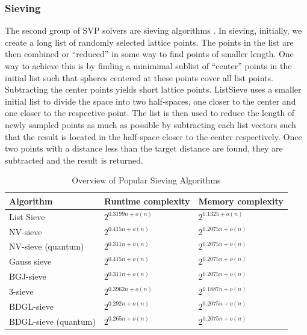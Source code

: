 \subsubsection{Sieving}
The second group of SVP solvers are sieving algorithms \cite{ADHKPS19, MV10, NV08, BGJ15, BLS16, HK17,BDGL16}. In sieving, initially, we create a long list of randomly selected lattice points. The points in the list are then combined or ``reduced'' in some way to find points of smaller length. One way to achieve this is by finding a minimimal sublist of ``center'' points in the initial list such that spheres centered at these points cover all list points. Subtracting the center points yields short lattice points. ListSieve \cite{MV10} uses a smaller initial list to divide the space into two half-spaces, one closer to the center and one closer to the respective point. The list is then used to reduce the length of newly sampled points as much as possible by subtracting each list vectors such that the result is located in the half-space closer to the center respectively. Once two points with a distance less than the target distance are found, they are subtracted and the result is returned.

\begin{table}[h]
  \centering
  \begin{tabular}{lll}
    \toprule
    Algorithm                                & Runtime complexity   & Memory complexity    \\\hline
    List Sieve \cite{MV10}                   & $2^{0.3199n + o(n)}$ & $2^{0.1325 + o(n)}$  \\
    NV-sieve \cite{NV08, ADHKPS19}           & $2^{0.415n + o(n)}$  & $2^{0.2075n + o(n)}$ \\
    NV-sieve (quantum) \cite{NV08, ADHKPS19} & $2^{0.311n + o(n)}$  & $2^{0.2075n + o(n)}$ \\
    Gauss sieve \cite{MV10, HK17}            & $2^{0.415n + o(n)}$  & $2^{0.2075n + o(n)}$ \\
    BGJ-sieve \cite{BGJ15}                   & $2^{0.311n + o(n)}$  & $2^{0.2075n + o(n)}$ \\
    3-sieve \cite{BLS16, HK17}               & $2^{0.3962n + o(n)}$ & $2^{0.1887n + o(n)}$ \\
    BDGL-sieve \cite{BDGL16}                 & $2^{0.292n + o(n)}$  & $2^{0.2075n + o(n)}$ \\
    BDGL-sieve (quantum) \cite{BDGL16}       & $2^{0.265n + o(n)}$  & $2^{0.2075n + o(n)}$ \\
    \bottomrule
  \end{tabular}
  \caption{Overview of Popular Sieving Algorithms} %
  \label{tab:sieving}
\end{table}

